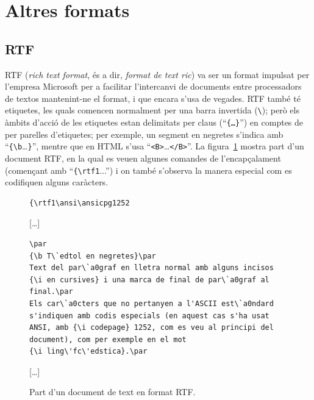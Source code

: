 \section{Altres formats}
\subsection{RTF}
\label{s3:RTF}

RTF (\emph{rich text format}, és a dir, \emph{format de text ric}) va
ser un format impulsat per l'empresa Microsoft per a facilitar
l'intercanvi de documents entre processadors de textos mantenint-ne el
format, i que encara s'usa de vegades. RTF també té etiquetes, les
quals comencen normalment per una barra invertida
(\texttt{\textbackslash}); però els àmbits d'acció de les etiquetes
estan delimitats per claus (``\texttt{\{\ldots\}}'') en comptes de per
parelles d'etiquetes; per exemple, un segment en negretes s'indica amb
``\verb+{\b+\ldots\verb+}+'', mentre que en HTML s'usa
``\verb+<B>+\ldots\verb+</B>+''. La figura~\ref{fg:RTF} mostra part
d'un document RTF, en la qual es veuen algunes comandes de
l'encapçalament (començant amb ``\verb+{\rtf1+...'') i on també
  s'observa la manera especial com es codifiquen alguns caràcters.

\begin{figure}
\begin{center}
\begin{verbatim}
{\rtf1\ansi\ansicpg1252
\end{verbatim}
[\ldots]
\begin{verbatim}
\par
{\b T\`edtol en negretes}\par
Text del par\`a0graf en lletra normal amb alguns incisos 
{\i en cursives} i una marca de final de par\`a0graf al 
final.\par  
Els car\`a0cters que no pertanyen a l'ASCII est\`a0ndard 
s'indiquen amb codis especials (en aquest cas s'ha usat 
ANSI, amb {\i codepage} 1252, com es veu al principi del 
document), com per exemple en el mot 
{\i ling\'fc\'edstica}.\par
\end{verbatim}
[\ldots]
\end{center}
\caption{Part d'un document de text en format RTF.}
\label{fg:RTF}
\end{figure}



